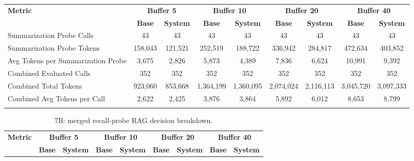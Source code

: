 \documentclass[pdflatex,sn-mathphys-num]{sn-jnl}%
\theoremstyle{thmstyleone}%
\theoremstyle{thmstyletwo}%
\theoremstyle{thmstylethree}%
\begin{document}
\begin{appendices}
\begin{landscape}
\begin{longtable}{@{}p{3.8cm}cccccccc@{}}
\toprule
\textbf{Metric} & \multicolumn{2}{c}{\textbf{Buffer 5}} & \multicolumn{2}{c}{\textbf{Buffer 10}} & \multicolumn{2}{c}{\textbf{Buffer 20}} & \multicolumn{2}{c}{\textbf{Buffer 40}} \\
\cmidrule(lr){2-3}\cmidrule(lr){4-5}\cmidrule(lr){6-7}\cmidrule(lr){8-9}
 & \textbf{Base} & \textbf{System} & \textbf{Base} & \textbf{System} & \textbf{Base} & \textbf{System} & \textbf{Base} & \textbf{System} \\
\midrule
\endhead
Summarization Probe Calls & 43 & 43 & 43 & 43 & 43 & 43 & 43 & 43 \\
Summarization Probe Tokens & 158,043 & 121,521 & 252,519 & 188,722 & 336,942 & 284,817 & 472,634 & 403,852 \\
Avg Tokens per Summarization Probe & 3,675 & 2,826 & 5,873 & 4,389 & 7,836 & 6,624 & 10,991 & 9,392 \\
Combined Evaluated Calls & 352 & 352 & 352 & 352 & 352 & 352 & 352 & 352 \\
Combined Total Tokens & 923,060 & 853,668 & 1,364,199 & 1,360,095 & 2,074,024 & 2,116,113 & 3,045,720 & 3,097,333 \\
Combined Avg Tokens per Call & 2,622 & 2,425 & 3,876 & 3,864 & 5,892 & 6,012 & 8,653 & 8,799 \\
\botrule
\end{longtable}
\normalsize
\end{landscape}
\begin{landscape}
\tiny
\begin{longtable}{@{}p{3.8cm}cccccccc@{}}
\caption{7B: merged recall-probe RAG decision breakdown.}\label{tab:app_7b_rag_probe}\\

\toprule
\textbf{Metric} & \multicolumn{2}{c}{\textbf{Buffer 5}} & \multicolumn{2}{c}{\textbf{Buffer 10}} & \multicolumn{2}{c}{\textbf{Buffer 20}} & \multicolumn{2}{c}{\textbf{Buffer 40}} \\
\cmidrule(lr){2-3}\cmidrule(lr){4-5}\cmidrule(lr){6-7}\cmidrule(lr){8-9}
 & \textbf{Base} & \textbf{System} & \textbf{Base} & \textbf{System} & \textbf{Base} & \textbf{System} & \textbf{Base} & \textbf{System} \\
\midrule
\endfirsthead


\end{longtable}
\end{landscape}
\end{appendices}
\end{document}
